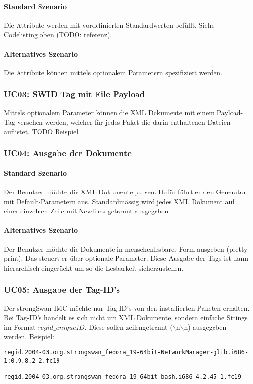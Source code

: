 \paragraph{Standard Szenario}
Die Attribute werden mit vordefinierten Standardwerten befüllt. Siehe Codelisting oben (TODO: referenz).

\paragraph{Alternatives Szenario}
Die Attribute können mittels optionalem Parametern spezifiziert werden.

\subsubsection{UC03: SWID Tag mit File Payload}
Mittels optionalem Parameter können die XML Dokumente mit einem Payload-Tag versehen werden, welcher für jedes Paket die darin enthaltenen Dateien auflistet.
TODO Beispiel

\subsubsection{UC04: Ausgabe der Dokumente}

\paragraph{Standard Szenario}
Der Benutzer möchte die XML Dokumente parsen. Dafür führt er den Generator mit
Default-Parametern aus. Standardmässig wird jedes XML Dokument auf einer einzelnen Zeile
mit Newlines getrennt ausgegeben.

\paragraph{Alternatives Szenario}
Der Benutzer möchte die Dokumente in menschenlesbarer Form ausgeben (pretty
print). Das steuert er über optionale Parameter. Diese Ausgabe der Tags ist dann
hierarchisch eingerückt um so die Lesbarkeit sicherzustellen.

\subsubsection{UC05: Ausgabe der Tag-ID's}
Der strongSwan IMC möchte nur Tag-ID's von den installierten Paketen erhalten. Bei Tag-ID's handelt es sich nicht um XML Dokumente, sondern einfache Strings im Format $regid\_uniqueID $. Diese sollen zeilengetrennt ($\backslash$n$\backslash$n) ausgegeben werden. Beispiel:\\
\begin{verbatim}
regid.2004-03.org.strongswan_fedora_19-64bit-NetworkManager-glib.i686-1:0.9.8.2-2.fc19

regid.2004-03.org.strongswan_fedora_19-64bit-bash.i686-4.2.45-1.fc19
\end{verbatim}
